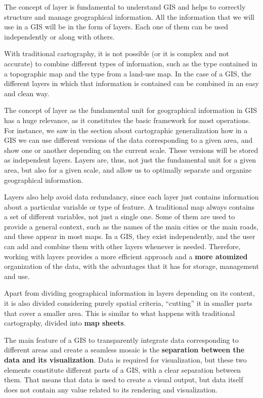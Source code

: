 The concept of layer is fundamental to understand GIS and helps to correctly structure and manage geographical information. All the information that we will use in a GIS will be in the form of layers. Each one of them can be used independently or along with others.

With traditional cartography, it is not possible (or it is complex and not accurate) to combine different types of information, such as the type contained in a topographic map and the type from a land-use map. In the case of a GIS, the different layers in which that information is contained can be combined in an easy and clean way.

The concept of layer as the fundamental unit for geographical information in GIS has a huge relevance, as it constitutes the basic framework for most operations. For instance, we saw in the section about cartographic generalization how in a GIS we can use different versions of the data corresponding to a given area, and show one or another depending on the current scale. These versions will be stored as independent layers. Layers are, thus, not just the fundamental unit for a given area, but also for a given scale, and allow us to optimally separate and organize geographical information. 

Layers also help avoid data redundancy, since each layer just contains information about a particular variable or type of feature. A traditional map always contains a set of different variables, not just a single one. Some of them are used to provide a general context, such as the names of the main cities or the main roads, and these appear in most maps. In a GIS, they exist independently, and the user can add and combine them with other layers whenever is needed. Therefore, working with layers provides a more efficient approach and a \textbf{more atomized} organization of the data, with the advantages that it has for storage, management and use.

Apart from dividing geographical information in layers depending on its content, it is also divided considering purely spatial criteria, ``cutting'' it in smaller parts that cover a smaller area. This is similar to what happens with traditional cartography, divided into \textbf{map sheets}.

The main feature of a GIS to transparently integrate data corresponding to different areas and create a seamless mosaic is the \textbf{separation between the data and its visualization}. Data is required for visualization, but these two elements constitute different parts of a GIS, with a clear separation between them. That means that data is used to create a visual output, but data itself does not contain any value related to its rendering and visualization.

